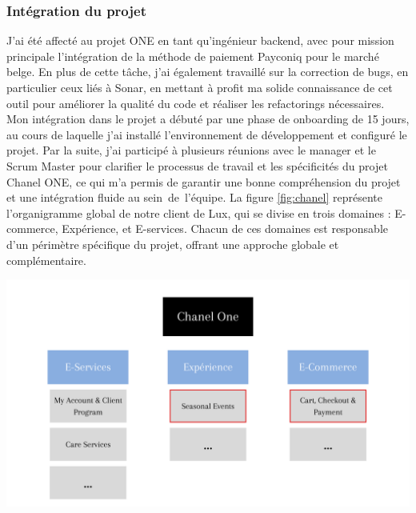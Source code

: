 \subsubsection{Intégration du projet}

J'ai été affecté au projet ONE en tant qu'ingénieur backend, avec pour mission principale l'intégration de la méthode de paiement Payconiq pour le marché belge. En plus de cette tâche, j'ai également travaillé sur la correction de bugs, en particulier ceux liés à Sonar, en mettant à profit ma solide connaissance de cet outil pour améliorer la qualité du code et réaliser les refactorings nécessaires. Mon intégration dans le projet a débuté par une phase de onboarding de 15 jours, au cours de laquelle j'ai installé l'environnement de développement et configuré le projet. Par la suite, j'ai participé à plusieurs réunions avec le manager et le Scrum Master pour clarifier le processus de travail et les spécificités du projet Chanel ONE, ce qui m'a permis de garantir une bonne compréhension du projet et une intégration fluide au sein de l'équipe.
La figure \ref{fig:chanel} représente l'organigramme global de notre client de Lux, qui se divise en trois domaines : E-commerce, Expérience, et E-services. Chacun de ces domaines est responsable d'un périmètre spécifique du projet, offrant une approche globale et complémentaire.
\begin{center}
    \centering
    \includegraphics[width=19cm]{Figures/chanelOne.png}
    \label{fig:chanel}
\end{center}
